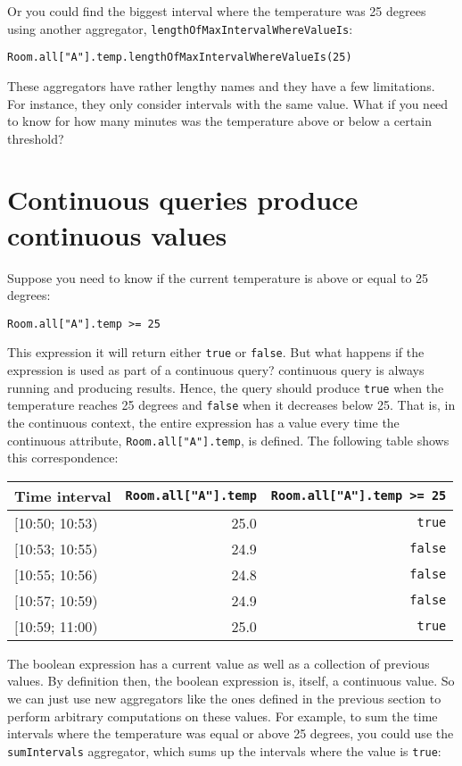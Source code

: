 \documentclass{report}
\begin{document}
Or you could find the biggest interval where the temperature was 25
degrees using another aggregator,
\verb=lengthOfMaxIntervalWhereValueIs=:

\begin{verbatim}
Room.all["A"].temp.lengthOfMaxIntervalWhereValueIs(25)
\end{verbatim}

These aggregators have rather lengthy names and they have a few
limitations. For instance, they only consider intervals with the same
value. What if you need to know for how many minutes was the
temperature above or below a certain threshold?

\section{Continuous queries produce continuous values}

Suppose you need to know if the current temperature is above or equal
to 25 degrees:

\begin{verbatim}
Room.all["A"].temp >= 25
\end{verbatim}

This expression it will return either \verb=true= or \verb=false=. But
what happens if the expression is used as part of a continuous query?
continuous query is always running and producing results. Hence, the
query should produce \verb=true= when the temperature reaches 25
degrees and \verb=false= when it decreases below 25. That is, in the
continuous context, the entire expression has a value every time the
continuous attribute, \verb=Room.all["A"].temp=, is defined. The
following table shows this correspondence:

\begin{tabular}{ |l|r|r| }
  \hline
  Time interval & \verb=Room.all["A"].temp= & \verb!Room.all["A"].temp >= 25! \\
  \hline
  $[$10:50; 10:53) & 25.0 & \verb=true=  \\
  $[$10:53; 10:55) & 24.9 & \verb=false= \\
  $[$10:55; 10:56) & 24.8 & \verb=false= \\
  $[$10:57; 10:59) & 24.9 & \verb=false= \\
  $[$10:59; 11:00) & 25.0 & \verb=true=  \\
  \hline
\end{tabular}

The boolean expression has a current value as well as a collection of
previous values. By definition then, the boolean expression is,
itself, a continuous value. So we can just use new aggregators like
the ones defined in the previous section to perform arbitrary
computations on these values. For example, to sum the time intervals
where the temperature was equal or above 25 degrees, you could use the
\verb=sumIntervals= aggregator, which sums up the intervals where the
value is \verb=true=:
\end{document}

